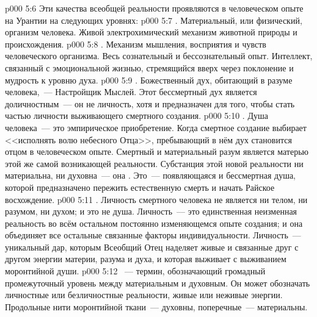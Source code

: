 \vs p000 5:6 \pc Эти качества всеобщей реальности проявляются в человеческом опыте на Урантии на следующих уровнях:
\vs p000 5:7 . Материальный, или физический, организм человека. Живой электрохимический механизм животной природы и происхождения.
\vs p000 5:8 . Механизм мышления, восприятия и чувств человеческого организма. Весь сознательный и бессознательный опыт. Интеллект, связанный с эмоциональной жизнью, стремящийся вверх через поклонение и мудрость к уровню духа.
\vs p000 5:9 . Божественный дух, обитающий в разуме человека,~--- Настройщик Мыслей. Этот бессмертный дух является доличностным~--- он не личность, хотя и предназначен для того, чтобы стать частью личности выживающего смертного создания.
\vs p000 5:10 . Душа человека~--- это эмпирическое приобретение. Когда смертное создание выбирает <<исполнять волю небесного Отца>>, пребывающий в нём дух становится отцом  в человеческом опыте. Смертный и материальный разум является матерью этой же самой возникающей реальности. Субстанция этой новой реальности ни материальна, ни духовна~--- она . Это~--- появляющаяся и бессмертная душа, которой предназначено пережить естественную смерть и начать Райское восхождение.
\vs p000 5:11 \pc {}. Личность смертного человека не является ни телом, ни разумом, ни духом; и это не душа. Личность~--- это единственная неизменная реальность во всём остальном постоянно изменяющемся опыте создания; и она объединяет все остальные связанные факторы индивидуальности. Личность~--- уникальный дар, которым Всеобщий Отец наделяет живые и связанные друг с другом энергии материи, разума и духа, и которая выживает с выживанием моронтийной души.
\vs p000 5:12 \pc {}~--- термин, обозначающий громадный промежуточный уровень между материальным и духовным. Он может обозначать личностные или безличностные реальности, живые или неживые энергии. Продольные нити моронтийной ткани~--- духовны, поперечные~--- материальны.
